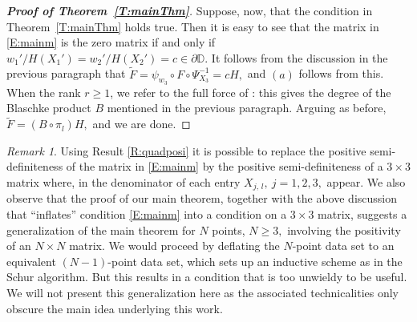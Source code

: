 \documentclass[11pt, reqno]{amsart}
\numberwithin{equation}{section}
\theoremstyle{definition}
\theoremstyle{remark}
\newtheorem{remark}[definition]{Remark}
\theoremstyle{plain}
\begin{document}
\begin{proof}[{\bf Proof of Theorem~\ref{T:mainThm}}]
Suppose, now, that the condition in Theorem~\ref{T:mainThm} holds true. Then it is easy to see that the matrix in 
\eqref{E:mainm} is the zero matrix if and only if $w_1'/H(X_1')=w_2'/H(X_2')=c\in\partial{\mathbb{D}}.$ It follows from
the discussion in the previous paragraph that
$\widetilde{F}=\psi_{w_3}\circ F\circ\Psi^{-1}_{X_3}=cH,$ and $(a)$ follows from this. When the rank $r\geq 1$,
we refer to the full force of \cite[Theorem 6.15]{agmac:ftp02}: this gives the degree of the Blaschke product $B$
mentioned in the previous paragraph. 
Arguing as before,  $\widetilde{F}=(B\circ\pi_l)H,$ and we are done.
\end{proof}
\medskip

\begin{remark}
Using Result \ref{R:quadposi} it is possible to replace the positive semi-definiteness of the matrix in \eqref{E:mainm} by
the positive semi-definiteness of a $3\times 3$ matrix where, in the denominator of each entry $X_{j,\,l}, \ j=1, 2, 3,$ appear.
We also observe that the proof of our main theorem, together with the above discussion that ``inflates'' condition \eqref{E:mainm}
into a condition on a $3\times 3$ matrix, suggests a generalization of the main theorem for $N$ points, $N\geq3,$
involving the positivity of an $N\times N$ matrix. We would proceed by deflating the   
$N$-point data set to an equivalent $(N-1)$-point data set, which sets up an inductive scheme as
in the Schur algorithm. But this results in a condition that is too unwieldy to be useful.
We will not present this generalization here as the associated technicalities only obscure the main idea underlying this work.

\end{remark}
\medskip

\end{document}
